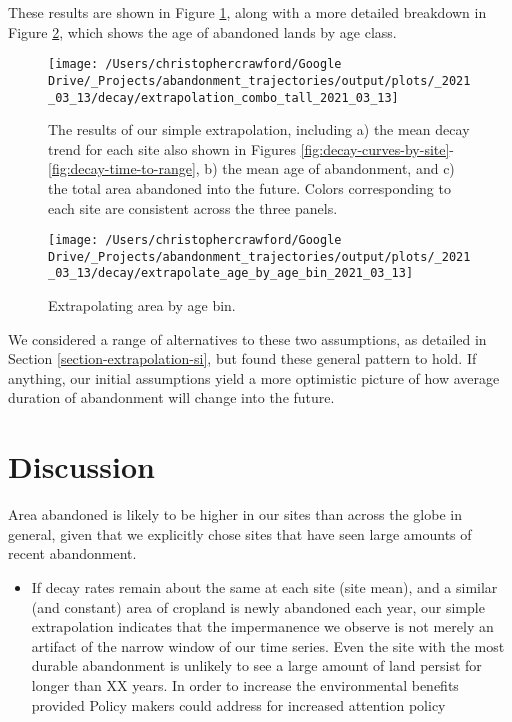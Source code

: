 \documentclass[
]{article}
\providecommand{\tightlist}{%
  \setlength{\itemsep}{0pt}\setlength{\parskip}{0pt}}
\begin{document}
These results are shown in Figure \ref{fig:extrapolation-combo}, along with a more detailed breakdown in Figure \ref{fig:extrapolation-area-by-age}, which shows the age of abandoned lands by age class.



\begin{figure}
\texttt{[image: /Users/christophercrawford/Google Drive/\_Projects/abandonment\_trajectories/output/plots/\_2021\_03\_13/decay/extrapolation\_combo\_tall\_2021\_03\_13]} \caption{The results of our simple extrapolation, including a) the mean decay trend for each site also shown in Figures \ref{fig:decay-curves-by-site}-\ref{fig:decay-time-to-range}, b) the mean age of abandonment, and c) the total area abandoned into the future. Colors corresponding to each site are consistent across the three panels.}\label{fig:extrapolation-combo}
\end{figure}







\begin{figure}
\texttt{[image: /Users/christophercrawford/Google Drive/\_Projects/abandonment\_trajectories/output/plots/\_2021\_03\_13/decay/extrapolate\_age\_by\_age\_bin\_2021\_03\_13]} \caption{Extrapolating area by age bin.}\label{fig:extrapolation-area-by-age}
\end{figure}

We considered a range of alternatives to these two assumptions, as detailed in Section \ref{section-extrapolation-si}, but found these general pattern to hold. If anything, our initial assumptions yield a more optimistic picture of how average duration of abandonment will change into the future.

\hypertarget{discussion}{%
\section{Discussion}\label{discussion}}

Area abandoned is likely to be higher in our sites than across the globe in general, given that we explicitly chose sites that have seen large amounts of recent abandonment.

\begin{itemize}
\tightlist
\item
  If decay rates remain about the same at each site (site mean), and a similar (and constant) area of cropland is newly abandoned each year, our simple extrapolation indicates that the impermanence we observe is not merely an artifact of the narrow window of our time series.
  Even the site with the most durable abandonment is unlikely to see a large amount of land persist for longer than XX years.
  In order to increase the environmental benefits provided
  Policy makers could address for increased attention policy
\end{itemize}
\end{document}
